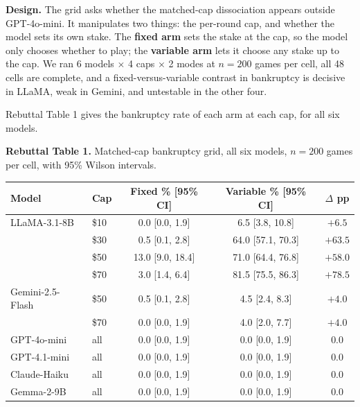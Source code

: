 \textbf{Design.} The grid asks whether the matched-cap dissociation appears outside GPT-4o-mini. It
manipulates two things: the per-round cap, and whether the model sets its own stake. The
\textbf{fixed arm} sets the stake at the cap, so the model only chooses whether to play; the
\textbf{variable arm} lets it choose any stake up to the cap. We ran 6 models $\times$ 4 caps
$\times$ 2 modes at $n = 200$ games per cell, all 48 cells are complete, and a fixed-versus-variable
contrast in bankruptcy is decisive in LLaMA, weak in Gemini, and untestable in the other four.

Rebuttal Table 1 gives the bankruptcy rate of each arm at each cap, for all six models.

\vspace{0.6em}
\noindent\textbf{Rebuttal Table 1.} Matched-cap bankruptcy grid, all six models, $n = 200$ games
per cell, with 95\% Wilson intervals.

\vspace{0.3em}
\noindent
\begin{tabular}{llccc}
\toprule
\textbf{Model} & \textbf{Cap} & \textbf{Fixed \% [95\% CI]} & \textbf{Variable \% [95\% CI]} & \textbf{$\Delta$ pp} \\
\midrule
LLaMA-3.1-8B     & \$10 & 0.0 [0.0, 1.9]   & 6.5 [3.8, 10.8]   & $+6.5$ \\
                 & \$30 & 0.5 [0.1, 2.8]   & 64.0 [57.1, 70.3] & $+63.5$ \\
                 & \$50 & 13.0 [9.0, 18.4] & 71.0 [64.4, 76.8] & $+58.0$ \\
                 & \$70 & 3.0 [1.4, 6.4]   & 81.5 [75.5, 86.3] & $+78.5$ \\
\addlinespace
Gemini-2.5-Flash & \$50 & 0.5 [0.1, 2.8]   & 4.5 [2.4, 8.3]    & $+4.0$ \\
                 & \$70 & 0.0 [0.0, 1.9]   & 4.0 [2.0, 7.7]    & $+4.0$ \\
\addlinespace
GPT-4o-mini      & all  & 0.0 [0.0, 1.9]   & 0.0 [0.0, 1.9]    & 0.0 \\
GPT-4.1-mini     & all  & 0.0 [0.0, 1.9]   & 0.0 [0.0, 1.9]    & 0.0 \\
Claude-Haiku     & all  & 0.0 [0.0, 1.9]   & 0.0 [0.0, 1.9]    & 0.0 \\
Gemma-2-9B       & all  & 0.0 [0.0, 1.9]   & 0.0 [0.0, 1.9]    & 0.0 \\
\bottomrule
\end{tabular}

\vspace{0.3em}
\vspace{0.6em}

